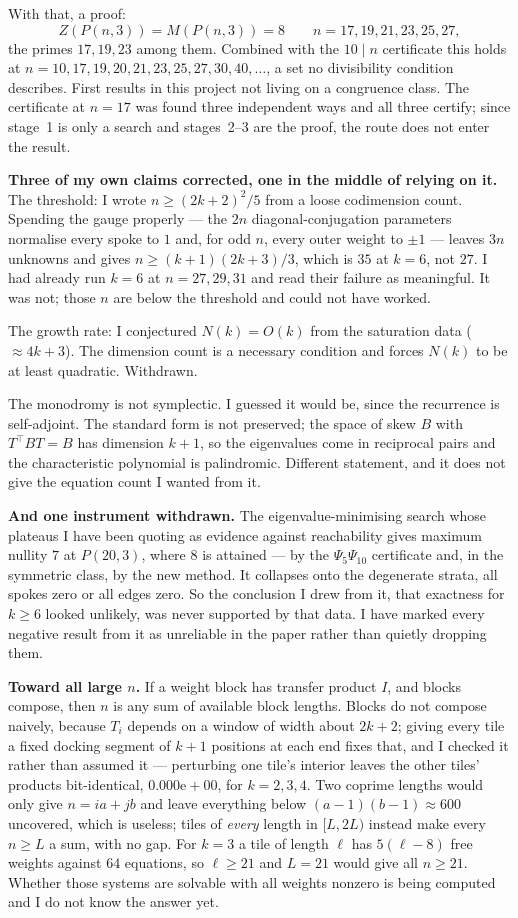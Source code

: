 \documentclass[12pt]{article}
\begin{document}
With that, a proof:
\[
  Z(P(n,3))=M(P(n,3))=8\qquad n=17,19,21,23,25,27,
\]
the primes $17,19,23$ among them. Combined with the $10\mid n$ certificate this
holds at $n=10,17,19,20,21,23,25,27,30,40,\dots$, a set no divisibility
condition describes. First results in this project not living on a congruence
class. The certificate at $n=17$ was found three independent ways and all three
certify; since stage~1 is only a search and stages~2--3 are the proof, the route
does not enter the result.

\textbf{Three of my own claims corrected, one in the middle of relying on it.}
The threshold: I wrote $n\ge(2k+2)^2/5$ from a loose codimension count. Spending
the gauge properly --- the $2n$ diagonal-conjugation parameters normalise every
spoke to $1$ and, for odd $n$, every outer weight to $\pm1$ --- leaves $3n$
unknowns and gives $n\ge(k+1)(2k+3)/3$, which is $35$ at $k=6$, not $27$. I had
already run $k=6$ at $n=27,29,31$ and read their failure as meaningful. It was
not; those $n$ are below the threshold and could not have worked.

The growth rate: I conjectured $N(k)=O(k)$ from the saturation data
($\approx4k+3$). The dimension count is a necessary condition and forces
$N(k)$ to be at least quadratic. Withdrawn.

The monodromy is not symplectic. I guessed it would be, since the recurrence is
self-adjoint. The standard form is not preserved; the space of skew $B$ with
$T^{\!\top}BT=B$ has dimension $k+1$, so the eigenvalues come in reciprocal
pairs and the characteristic polynomial is palindromic. Different statement,
and it does not give the equation count I wanted from it.

\textbf{And one instrument withdrawn.} The eigenvalue-minimising search whose
plateaus I have been quoting as evidence against reachability gives maximum
nullity $7$ at $P(20,3)$, where $8$ is attained --- by the $\Psi_5\Psi_{10}$
certificate and, in the symmetric class, by the new method. It collapses onto
the degenerate strata, all spokes zero or all edges zero. So the conclusion I
drew from it, that exactness for $k\ge6$ looked unlikely, was never supported by
that data. I have marked every negative result from it as unreliable in the
paper rather than quietly dropping them.

\textbf{Toward all large $n$.} If a weight block has transfer product $I$, and
blocks compose, then $n$ is any sum of available block lengths. Blocks do not
compose naively, because $T_i$ depends on a window of width about $2k+2$; giving
every tile a fixed docking segment of $k+1$ positions at each end fixes that,
and I checked it rather than assumed it --- perturbing one tile's interior leaves
the other tiles' products bit-identical, $0.000\mathrm{e}{+}00$, for $k=2,3,4$.
Two coprime lengths would only give $n=ia+jb$ and leave everything below
$(a-1)(b-1)\approx600$ uncovered, which is useless; tiles of \emph{every} length
in $[L,2L)$ instead make every $n\ge L$ a sum, with no gap. For $k=3$ a tile of
length $\ell$ has $5(\ell-8)$ free weights against $64$ equations, so $\ell\ge21$
and $L=21$ would give all $n\ge21$. Whether those systems are solvable with all
weights nonzero is being computed and I do not know the answer yet.
\end{document}
